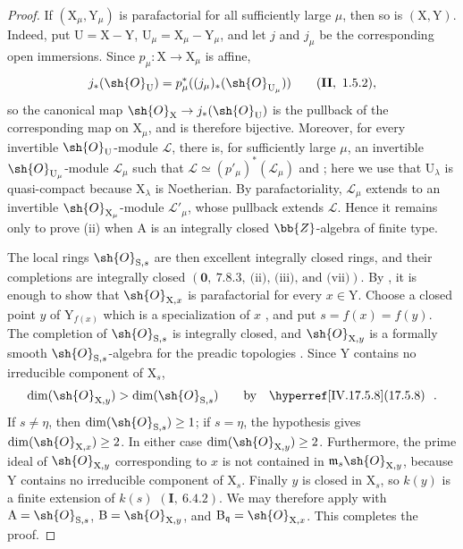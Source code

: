 \begin{proof}
If $(\mathrm{X}_\mu,\mathrm{Y}_\mu)$ is parafactorial for all sufficiently large $\mu$, then so is $(\mathrm{X},\mathrm{Y})$. Indeed, put $\mathrm{U}=\mathrm{X}-\mathrm{Y}$, $\mathrm{U}_\mu=\mathrm{X}_\mu-\mathrm{Y}_\mu$, and let $j$ and $j_\mu$ be the corresponding open immersions. Since $p_\mu:\mathrm{X}\to\mathrm{X}_\mu$ is affine,
\[
  j_*(\sh{O}_{\mathrm{U}})=p_\mu^*((j_\mu)_*(\sh{O}_{\mathrm{U}_\mu}))
  \qquad (\mathbf{II},\ 1.5.2),
\]
so the canonical map $\sh{O}_{\mathrm{X}}\to j_*(\sh{O}_{\mathrm{U}})$ is the pullback of the corresponding map on $\mathrm{X}_\mu$, and is therefore bijective. Moreover, for every invertible $\sh{O}_{\mathrm{U}}$-module $\mathscr{L}$, there is, for sufficiently large $\mu$, an invertible $\sh{O}_{\mathrm{U}_\mu}$-module $\mathscr{L}_\mu$ such that $\mathscr{L}\simeq(p'_\mu)^*(\mathscr{L}_\mu)$  and ; here we use that $\mathrm{U}_\lambda$ is quasi-compact because $\mathrm{X}_\lambda$ is Noetherian. By parafactoriality, $\mathscr{L}_\mu$ extends to an invertible $\sh{O}_{\mathrm{X}_\mu}$-module $\mathscr{L}'_\mu$, whose pullback extends $\mathscr{L}$. Hence it remains only to prove (ii) when $\mathrm{A}$ is an integrally closed $\bb{Z}$-algebra of finite type.

The local rings $\sh{O}_{\mathrm{S},s}$ are then excellent integrally closed rings, and their completions are integrally closed $(\mathbf{0},\ 7.8.3,\ \text{(ii), (iii), and (vii)})$. By , it is enough to show that $\sh{O}_{\mathrm{X},x}$ is parafactorial for every $x\in\mathrm{Y}$. Choose a closed point $y$ of $\mathrm{Y}_{f(x)}$ which is a specialization of $x$ , and put $s=f(x)=f(y)$. The completion of $\sh{O}_{\mathrm{S},s}$ is integrally closed, and $\sh{O}_{\mathrm{X},y}$ is a formally smooth $\sh{O}_{\mathrm{S},s}$-algebra for the preadic topologies . Since $\mathrm{Y}$ contains no irreducible component of $\mathrm{X}_s$,
\[
  \dim(\sh{O}_{\mathrm{X},y})>\dim(\sh{O}_{\mathrm{S},s})
  \qquad\text{by \sref{IV.17.5.8}}.
\]
If $s\neq\eta$, then $\dim(\sh{O}_{\mathrm{S},s})\geq1$; if $s=\eta$, the hypothesis gives $\dim(\sh{O}_{\mathrm{X},x})\geq2$. In either case $\dim(\sh{O}_{\mathrm{X},y})\geq2$. Furthermore, the prime ideal of $\sh{O}_{\mathrm{X},y}$ corresponding to $x$ is not contained in $\mathfrak{m}_s\sh{O}_{\mathrm{X},y}$, because $\mathrm{Y}$ contains no irreducible component of $\mathrm{X}_s$. Finally $y$ is closed in $\mathrm{X}_s$, so $k(y)$ is a finite extension of $k(s)$ $(\mathbf{I},\ 6.4.2)$. We may therefore apply  with $\mathrm{A}=\sh{O}_{\mathrm{S},s}$, $\mathrm{B}=\sh{O}_{\mathrm{X},y}$, and $\mathrm{B}_{\mathfrak{q}}=\sh{O}_{\mathrm{X},x}$. This completes the proof.
\end{proof}

